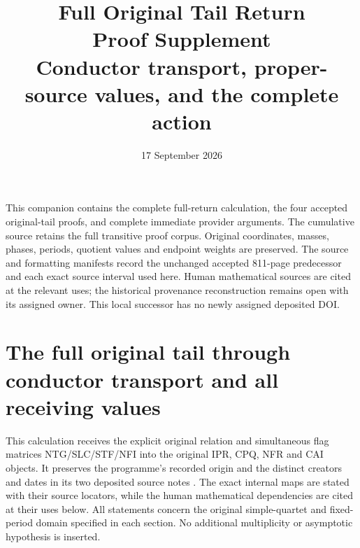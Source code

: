 \documentclass[11pt,a4paper]{article}
\title{Full Original Tail Return\\Proof Supplement\\
\large Conductor transport, proper-source values, and the complete action}
\author{}
\date{17 September 2026}
\begin{document}
\maketitle
\begingroup\raggedright
This companion contains the complete full-return calculation, the four
accepted original-tail proofs, and complete immediate provider arguments.
The cumulative source retains the full transitive proof corpus. Original
coordinates, masses, phases, periods, quotient values and endpoint weights
are preserved. The source and formatting manifests record the unchanged
accepted 811-page predecessor and each exact source interval used here.
Human mathematical sources are cited at the relevant uses; the historical
provenance reconstruction remains open with its assigned owner.
This local successor has no newly assigned deposited DOI.
\par\endgroup
\makeatletter
\renewcommand*\l@section{\@dottedtocline{1}{0em}{3.8em}}
\renewcommand*\l@subsection{\@dottedtocline{2}{3.8em}{4.5em}}
\renewcommand*\l@subsubsection{\@dottedtocline{3}{8.3em}{5.5em}}
\makeatother
\tableofcontents
\clearpage
\label{FRBUILD:receiver:start}
\begingroup
\section{The full original tail through conductor transport and all receiving values}
\label{sec:FTR}
This calculation receives the explicit original relation and simultaneous
flag matrices NTG/SLC/STF/NFI into the original IPR, CPQ, NFR and CAI
objects. It preserves the programme's recorded origin and the distinct
creators and dates in its two deposited source notes
\cite{human:globalization2026,human:splitzero2026}.
The exact internal maps are stated with their source locators, while
the human mathematical dependencies are cited at their uses below.
All statements concern the original simple-quartet and fixed-period
domain specified in each section. No additional multiplicity or
asymptotic hypothesis is inserted.
\end{document}
